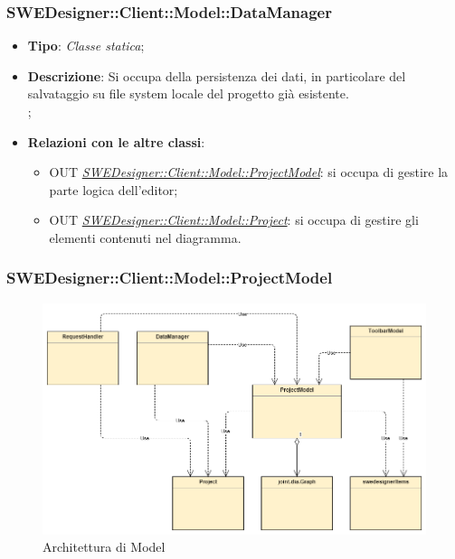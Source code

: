\documentclass[../SpecificaTecnica.tex]{subfiles}
\begin{document}
				\subsubsection{SWEDesigner::Client::Model::DataManager}
				\hypertarget{SWEDesigner::Client::Model::DataManager}{}
					\begin{itemize}
						\item \textbf{Tipo}: \emph{Classe statica};
						\item \textbf{Descrizione}: Si occupa della persistenza dei dati, in particolare del salvataggio su file system locale del progetto già esistente.\\;
						\item \textbf{Relazioni con le altre classi}:
						\begin{itemize}
							\item OUT \hyperlink{SWEDesigner::Client::Model::ProjectModel}{\emph{SWEDesigner::Client::Model::ProjectModel}}: si occupa di gestire la parte logica dell'editor;
							\item OUT \hyperlink{SWEDesigner::Client::Model::Project}{\emph{SWEDesigner::Client::Model::Project}}: si occupa di gestire gli elementi contenuti nel diagramma.
						\end{itemize}
					\end{itemize}

				\subsubsection{SWEDesigner::Client::Model::ProjectModel}
				\hypertarget{SWEDesigner::Client::Model::ProjectModel}{}
					\begin{figure}[H]\label{fig:Model}
						\centering
						\includegraphics[scale=0.46]{Immagini/DiagrammaArchitettura/MainModel.png}
						\caption{Architettura di Model}
					\end{figure}
\end{document}
